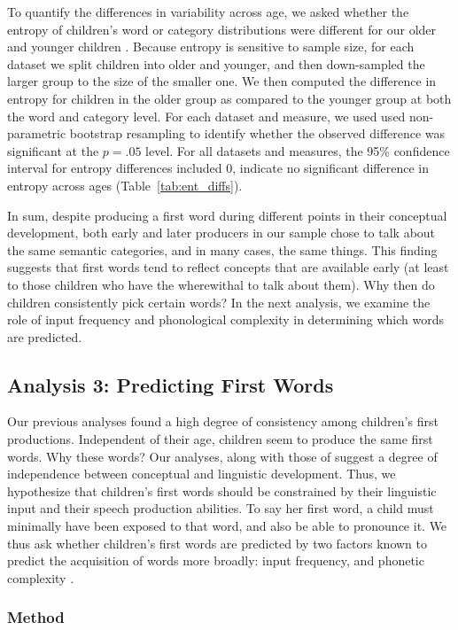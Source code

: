 \documentclass[10pt,letterpaper]{article}
\begin{document}
To quantify the differences in variability across age, we asked whether the entropy of children's word or category distributions were different for our older and younger children \cite{shannon1948}. Because entropy is sensitive to sample size, for each dataset we split children into older and younger, and then down-sampled the larger group to the size of the smaller one. We then computed the difference in entropy for children in the older group as compared to the younger group at both the word and category level. For each dataset and measure, we used used non-parametric bootstrap resampling to identify whether the observed difference was significant at the $p = .05$ level. For all datasets and measures, the 95\% confidence interval for entropy differences included 0, indicate no significant difference in entropy across ages (Table~\ref{tab:ent_diffs}).

In sum, despite producing a first word during different points in their conceptual development, both early and later producers in our sample chose to talk about the same semantic categories, and in many cases, the same things. This finding suggests that first words tend to reflect concepts that are available early (at least to those children who have the wherewithal to talk about them). Why then do children consistently pick certain words? In the next analysis, we examine the role of input frequency and phonological complexity in determining which words are predicted. 

\subsection{Analysis 3: Predicting First Words}

Our previous analyses found a high degree of consistency among children's first productions. Independent of their age, children seem to produce the same first words. Why these words? Our analyses, along with those of  suggest a degree of independence between conceptual and linguistic development. Thus, we hypothesize that children's first words should be constrained by their linguistic input and their speech production abilities. To say her first word, a child must minimally have been exposed to that word, and also be able to pronounce it. We thus ask whether children's first words are predicted by two factors known to predict the acquisition of words more broadly: input frequency, and phonetic complexity \cite{morgan1996,goodman2008}.

\subsubsection{Method}
\end{document}
